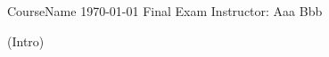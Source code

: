 \documentclass{article}
\begin{document}
\heading
{CourseName}
{\today}
{Final Exam}
{Instructor: Aaa Bbb}
{}

\vspace{0.3cm}
(Intro) \lipsum[1-1]

\hrulefill

\end{document}
